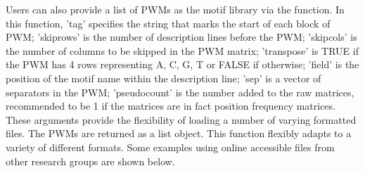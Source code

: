 \documentclass[a4paper,10pt]{article}\usepackage[]{graphicx}\usepackage[]{color}
\begin{document}

Users can also provide a list of PWMs as the motif library via the  function. In this function, 'tag' specifies the string that marks the start of each block of PWM; 'skiprows' is the number of description lines before the PWM; 'skipcols' is the number of columns to be skipped in the PWM matrix; 'transpose' is TRUE if the PWM has 4 rows representing A, C, G, T or FALSE if otherwise; 'field' is the position of the motif name within the description line; 'sep' is a vector of separators in the PWM; 'pseudocount' is the number added to the raw matrices, recommended to be 1 if the matrices are in fact position frequency matrices. These arguments provide the flexibility of loading a number of varying formatted files. The PWMs are returned as a list object. This function flexibly adapts to a variety of different formats. Some examples using online accessible files from other research groups are shown below.
\end{document}
